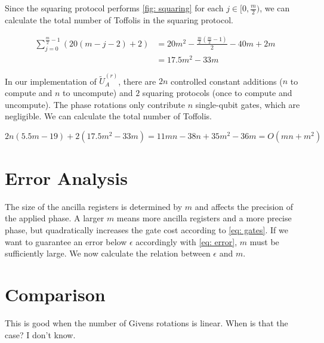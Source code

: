 Since the squaring protocol performs \ref{fig: squaring} for each $j \in [0, \frac{m}{2})$, we can calculate the total number of Toffolis in the squaring protocol.

\begin{equation}
    \begin{split}
        \sum_{j = 0}^{\frac{m}{2} - 1} (20(m - j - 2) + 2) &= 20m^2 - \frac{\frac{m}{2}(\frac{m}{2} - 1)}{2} - 40m + 2m \\
        &= 17.5m^2 - 33m
    \end{split}
\end{equation}

In our implementation of $\tilde{U}_A^{(r)}$, there are $2n$ controlled constant additions ($n$ to compute and $n$ to uncompute) and $2$ squaring protocols (once to compute and uncompute). The phase rotations only contribute $n$ single-qubit gates, which are negligible. We can calculate the total number of Toffolis.

\begin{equation}
    2n(5.5m - 19) + 2(17.5m^2 - 33m) = 11mn - 38n + 35m^2 - 36m = O(mn + m^2) \label{eq: gates}
\end{equation}

\section{Error Analysis}

The size of the ancilla registers is determined by $m$ and affects the precision of the applied phase. A larger $m$ means more ancilla registers and a more precise phase, but quadratically increases the gate cost according to \eqref{eq: gates}. If we want to guarantee an error below $\epsilon$ accordingly with \eqref{eq: error}, $m$ must be sufficiently large. We now calculate the relation between $\epsilon$ and $m$.

\section{Comparison}

This is good when the number of Givens rotations is linear. When is that the case? I don't know.



